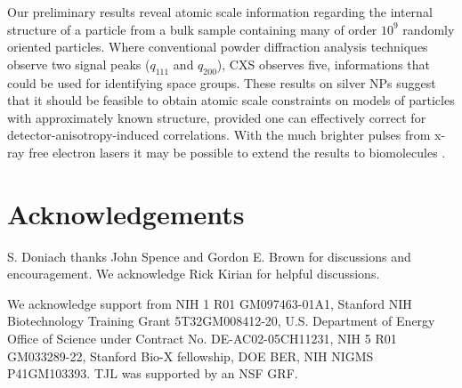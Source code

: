 \documentclass [11pt,fleqn]{article}
\begin{document}
Our preliminary results reveal atomic scale information regarding the internal structure of a particle from a bulk sample containing many of order $10^9$ randomly oriented particles. Where conventional powder diffraction analysis techniques observe two signal peaks ($q_{111}$ and $q_{200}$), CXS observes five, informations that could be used for identifying space groups. These results on silver NPs suggest that it should be feasible to obtain atomic scale constraints on models of particles with approximately known structure, provided one can effectively correct for detector-anisotropy-induced correlations. With the much brighter pulses from x-ray free electron lasers it may be possible to extend the results to biomolecules \cite{Neutze:2000ih, Spence:2012eo}. 

\section{Acknowledgements}
S. Doniach thanks John Spence and Gordon E. Brown for discussions and encouragement. We acknowledge Rick Kirian for helpful discussions.

We acknowledge support from NIH 1 R01 GM097463-01A1, Stanford NIH Biotechnology Training Grant 5T32GM008412-20, U.S. Department of Energy Office of Science under Contract No. DE-AC02-05CH11231, NIH 5 R01 GM033289-22, Stanford Bio-X fellowship, DOE BER, NIH NIGMS P41GM103393. TJL was supported by an NSF GRF.
\end{document}
